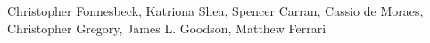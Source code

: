 Christopher Fonnesbeck, Katriona Shea, Spencer Carran, Cassio de Moraes, Christopher Gregory, James L. Goodson, Matthew Ferrari
